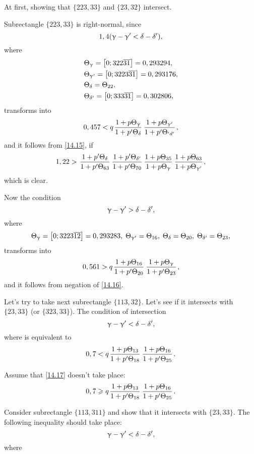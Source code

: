 At first, showing that $\{223, 33\}$ and $\{23, 32\}$ intersect.

Subrectangle $\{223, 33\}$ is right-normal, since
\begin{equation*}
	1,4 (\upgamma - \upgamma' < \delta - \delta'),
\end{equation*}
where
\begin{align*}
	&\Theta_{\upgamma} = \left[0; 322 \overline{31}\right] = 0,293294,\\
	&\Theta_{\upgamma'} = \left[0; 3223\overline{31}\right] = 0,293176,\\
	&\Theta_{\delta} = \Theta_{22},\\
	&\Theta_{\delta'} = \left[0;333\overline{31}\right] = 0,302806,
\end{align*}
transforms into
\begin{equation*}
	0,457 < q \up{\g}{\d} \up{\g'}{'d'},
\end{equation*}
and it follows from \ref{14.15}, if
\begin{equation*}
	1,22 > \pp{\d}{63} \pp{\d'}{70} \uu{35}{\g} \uu{63}{\g'},
\end{equation*}
which is clear.

Now the condition
\begin{equation*}
	\upgamma - \upgamma' > \delta - \delta',
\end{equation*}
where
\begin{equation*}
	\Theta_{\upgamma} = \left[0; 3223\overline{12}\right] = 0,293283,\; \Theta_{\upgamma'} = \Theta_{16},\; \Theta_{\delta} = \Theta_{20},\; \Theta_{\delta'} = \Theta_{23},
\end{equation*}
transforms into
\begin{equation*}
	0,561 > q \up{16}{20} \up{\g}{23},
\end{equation*}
and it follows from negation of \ref{14.16}.

Let's try to take next subrectangle $\{113, 32\}$.
Let's see if it intersects with $\{23, 33\}$ (or $\{323, 33\}$).
The condition of intersection
\begin{equation*}
	\upgamma - \upgamma' < \delta - \delta',
\end{equation*}
where
is equivalent to
\begin{equation}\label{14.17}
	0,7 < q \up{13}{18} \up{16}{25}.
\end{equation}

Assume that \ref{14.17} doesn't take place:
\begin{equation}\label{14.18}
	0,7 \geqslant q \up{13}{18} \up{16}{25}.
\end{equation}

Consider subrectangle $\{113, 311\}$ and show that it intersects with $\{23, 33\}$.
The following inequality should take place:
\begin{equation*}
	\upgamma - \upgamma' < \delta - \delta',
\end{equation*}
where

